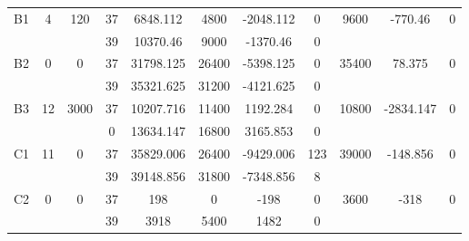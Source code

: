 \begin{sidewaystable}
\begin{tabular}{c||c|c||c|c|c|c|c||c|c|c}
        
      \\
      \hline
      \multirow{2}{*}{B1} &
      \multirow{2}{*}{4} &
      \multirow{2}{*}{120} &
      37 &
      6848.112 &
      4800 &
        -2048.112 &
        0 &
      \multirow{2}{*}{9600} &
        \multirow{2}{*}{-770.46} &
        \multirow{2}{*}{0}
      \\
      \cline{4-8}
       &
       &
       &
      39 &
      10370.46 &
      9000 &
        -1370.46 &
        0 &
      
         &
        
      \\
      \hline
      \multirow{2}{*}{B2} &
      \multirow{2}{*}{0} &
      \multirow{2}{*}{0} &
      37 &
      31798.125 &
      26400 &
        -5398.125 &
        0 &
      \multirow{2}{*}{35400} &
        \multirow{2}{*}{78.375} &
        \multirow{2}{*}{0}
      \\
      \cline{4-8}
       &
       &
       &
      39 &
      35321.625 &
      31200 &
        -4121.625 &
        0 &
      
         &
        
      \\
      \hline
      \multirow{2}{*}{B3} &
      \multirow{2}{*}{12} &
      \multirow{2}{*}{3000} &
      37 &
      10207.716 &
      11400 &
        1192.284 &
        0 &
      \multirow{2}{*}{10800} &
        \multirow{2}{*}{-2834.147} &
        \multirow{2}{*}{0}
      \\
      \cline{4-8}
       &
       &
       &
      0 &
      13634.147 &
      16800 &
        3165.853 &
        0 &
      
         &
        
      \\
      \hline
      \multirow{2}{*}{C1} &
      \multirow{2}{*}{11} &
      \multirow{2}{*}{0} &
      37 &
      35829.006 &
      26400 &
        -9429.006 &
        123 &
      \multirow{2}{*}{39000} &
        \multirow{2}{*}{-148.856} &
        \multirow{2}{*}{0}
      \\
      \cline{4-8}
       &
       &
       &
      39 &
      39148.856 &
      31800 &
        -7348.856 &
        8 &
      
         &
        
      \\
      \hline
      \multirow{2}{*}{C2} &
      \multirow{2}{*}{0} &
      \multirow{2}{*}{0} &
      37 &
      198 &
      0 &
        -198 &
        0 &
      \multirow{2}{*}{3600} &
        \multirow{2}{*}{-318} &
        \multirow{2}{*}{0}
      \\
      \cline{4-8}
       &
       &
       &
      39 &
      3918 &
      5400 &
        1482 &
        0 &
      

\end{tabular}
\end{sidewaystable}
